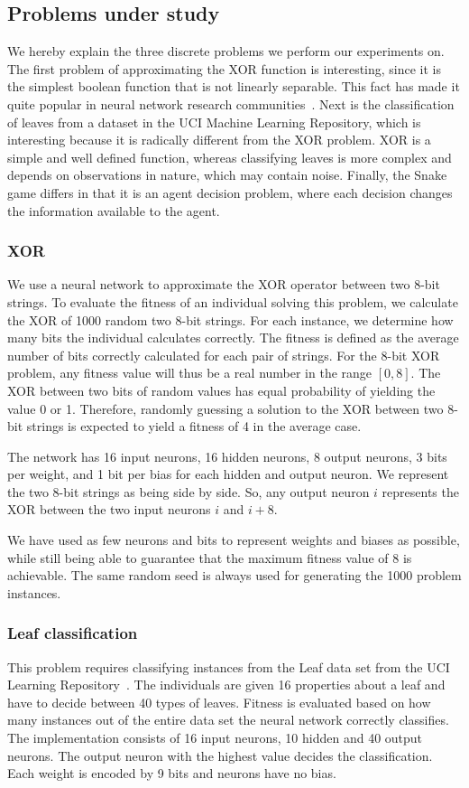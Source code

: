 \subsection{Problems under study}
\label{sec:problems}
We hereby explain the three discrete problems we perform our experiments on. The first problem of approximating the XOR function is interesting, since it is the simplest boolean function that is not linearly separable. This fact has made it quite popular in neural network research communities~\cite{masterThesisGANN}. Next is the classification of leaves from a dataset in the UCI Machine Learning Repository, which is interesting because it is radically different from the XOR problem. XOR is a simple and well defined function, whereas classifying leaves is more complex and depends on observations in nature, which may contain noise. Finally, the Snake game differs in that it is an agent decision problem, where each decision changes the information available to the agent.

\subsubsection{XOR}
We use a neural network to approximate the XOR operator between two 8-bit strings. To evaluate the fitness of an individual solving this problem, we calculate the XOR of \num{1000} random two 8-bit strings. For each instance, we determine how many bits the individual calculates correctly. The fitness is defined as the average number of bits correctly calculated for each pair of strings. For the 8-bit XOR problem, any fitness value will thus be a real number in the range $[0, 8]$. The XOR between two bits of random values has equal probability of yielding the value 0 or 1. Therefore, randomly guessing a solution to the XOR between two 8-bit strings is expected to yield a fitness of 4 in the average case.

The network has 16 input neurons, 16 hidden neurons, 8 output neurons, 3 bits per weight, and 1 bit per bias for each hidden and output neuron. We represent the two 8-bit strings as being side by side. So, any output neuron $i$ represents the XOR between the two input neurons $i$ and $i + 8$. 

We have used as few neurons and bits to represent weights and biases as possible, while still being able to guarantee that the maximum fitness value of 8 is achievable.
The same random seed is always used for generating the 1000 problem instances.

\subsubsection{Leaf classification}
This problem requires classifying instances from the Leaf data set from the UCI Learning Repository~\cite{Bache+Lichman:2013, leafdataset}. The individuals are given 16 properties about a leaf and have to decide between 40 types of leaves. Fitness is evaluated based on how many instances out of the entire data set the neural network correctly classifies. The implementation consists of 16 input neurons, 10 hidden and 40 output neurons. The output neuron with the highest value decides the classification. Each weight is encoded by 9 bits and neurons have no bias.

